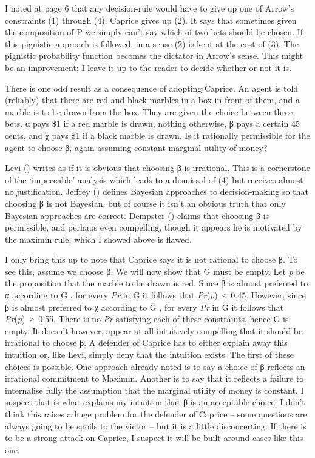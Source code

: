 \documentclass[
  10pt,
  letterpaper,
  DIV=11,
  numbers=noendperiod,
  twoside]{scrartcl}
\begin{document}
I noted at page 6 that any decision-rule would have to give up one of
Arrow's constraints (1) through (4). Caprice gives up (2). It says that
sometimes given the composition of P we simply can't say which of two
bets should be chosen. If this pignistic approach is followed, in a
sense (2) is kept at the cost of (3). The pignistic probability function
becomes the dictator in Arrow's sense. This might be an improvement; I
leave it up to the reader to decide whether or not it is.

There is one odd result as a consequence of adopting Caprice. An agent
is told (reliably) that there are red and black marbles in a box in
front of them, and a marble is to be drawn from the box. They are given
the choice between three bets. α pays \$1 if a red marble is drawn,
nothing otherwise, β pays a certain 45 cents, and χ pays \$1 if a black
marble is drawn. Is it rationally permissible for the agent to choose β,
again assuming constant marginal utility of money?

Levi () writes as if it is obvious that
choosing β is irrational. This is a cornerstone of the `impeccable'
analysis which leads to a dismissal of (4) but receives almost no
justification. Jeffrey () defines
Bayesian approaches to decision-making so that choosing β is not
Bayesian, but of course it isn't an obvious truth that only Bayesian
approaches are correct. Dempster ()
claims that choosing β is permissible, and perhaps even compelling,
though it appears he is motivated by the maximin rule, which I showed
above is flawed.

I only bring this up to note that Caprice says it is not rational to
choose β. To see this, assume we choose β. We will now show that G must
be empty. Let \emph{p} be the proposition that the marble to be drawn is
red. Since β is almost preferred to α according to G , for every
\emph{Pr} in G it follows that \emph{Pr}(\emph{p})~≤~0.45. However,
since β is almost preferred to χ according to G , for every \emph{Pr} in
G it follows that \emph{Pr}(\emph{p})~≥~0.55. There is no \emph{Pr}
satisfying each of these constraints, hence G is empty. It doesn't
however, appear at all intuitively compelling that it should be
irrational to choose β. A defender of Caprice has to either explain away
this intuition or, like Levi, simply deny that the intuition exists. The
first of these choices is possible. One approach already noted is to say
a choice of β reflects an irrational commitment to Maximin. Another is
to say that it reflects a failure to internalise fully the assumption
that the marginal utility of money is constant. I suspect that is what
explains my intuition that β is an acceptable choice. I don't think this
raises a huge problem for the defender of Caprice -- some questions are
always going to be spoils to the victor -- but it is a little
disconcerting. If there is to be a strong attack on Caprice, I suspect
it will be built around cases like this one.
\end{document}
